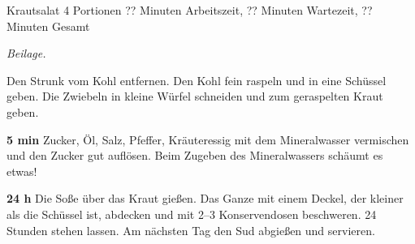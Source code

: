 \begin{recipe}{Krautsalat} {4 Portionen} {?? Minuten Arbeitszeit, ?? Minuten Wartezeit, ?? Minuten Gesamt}

  \freeform{}\textit{Beilage.}


  Den Strunk vom Kohl entfernen.
  Den Kohl fein raspeln und in eine Schüssel geben.
  Die Zwiebeln in kleine Würfel schneiden und zum geraspelten Kraut geben.

  \newstep{}\textbf{5 min}
  Zucker, Öl, Salz, Pfeffer, Kräuteressig mit dem Mineralwasser vermischen und den Zucker gut auflösen.
  Beim Zugeben des Mineralwassers schäumt es etwas!

  \newstep{}\textbf{24 h}
  Die Soße über das Kraut gießen.
  Das Ganze mit einem Deckel, der kleiner als die Schüssel ist, abdecken und mit 2--3 Konservendosen beschweren.
  24 Stunden stehen lassen.
  Am nächsten Tag den Sud abgießen und servieren.

  \freeform{}\hrulefill{}

\end{recipe}
